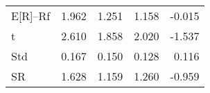\begin{tabular}{lrrrr}
\toprule
\midrule
E[R]--Rf & 1.962 & 1.251 & 1.158 & -0.015 \\
t & 2.610 & 1.858 & 2.020 & -1.537 \\
Std & 0.167 & 0.150 & 0.128 & 0.116 \\
SR & 1.628 & 1.159 & 1.260 & -0.959 \\
\bottomrule
\end{tabular}
